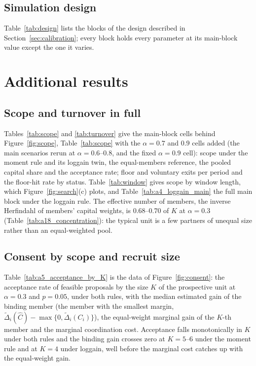 

\subsection{Simulation design}\label{app:design}

Table~\ref{tab:design} lists the blocks of the design described in Section~\ref{sec:calibration}; every block holds every parameter at its main-block value except the one it varies.



\section{Additional results}\label{app:results}

\subsection{Scope and turnover in full}\label{app:scope}

Tables~\ref{tab:scope} and \ref{tab:turnover} give the main-block cells behind Figure~\ref{fig:scope}, Table~\ref{tab:scope} with the $\alpha = 0.7$ and $0.9$ cells added (the main scenarios rerun at $\alpha = 0.6$--$0.8$, and the fixed $\alpha = 0.9$ cell): scope under the moment rule and its loggain twin, the equal-members reference, the pooled capital share and the acceptance rate; floor and voluntary exits per period and the floor-hit rate by status. Table~\ref{tab:window} gives scope by window length, which Figure~\ref{fig:search}(c) plots, and Table~\ref{tab:a4_loggain_main} the full main block under the loggain rule. The effective number of members, the inverse Herfindahl of members' capital weights, is 0.68--0.70 of $K$ at $\alpha = 0.3$ (Table~\ref{tab:a18_concentration}): the typical unit is a few partners of unequal size rather than an equal-weighted pool.






\subsection{Consent by scope and recruit size}\label{app:A6}

Table~\ref{tab:a5_acceptance_by_K} is the data of Figure~\ref{fig:consent}: the acceptance rate of feasible proposals by the size $K$ of the prospective unit at $\alpha = 0.3$ and $p = 0.05$, under both rules, with the median estimated gain of the binding member (the member with the smallest margin, $\tilde\Delta_i(\hat C) - \max\{0, \tilde\Delta_i(C_i)\}$), the equal-weight marginal gain of the $K$-th member and the marginal coordination cost. Acceptance falls monotonically in $K$ under both rules and the binding gain crosses zero at $K = 5$--6 under the moment rule and at $K = 4$ under loggain, well before the marginal cost catches up with the equal-weight gain.

